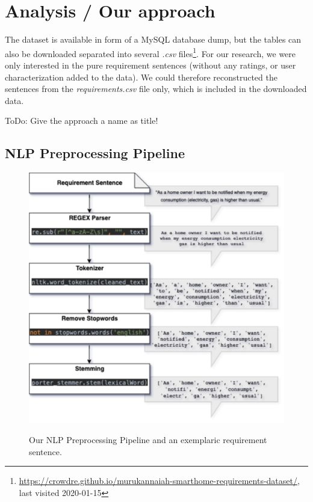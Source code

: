 \section{Analysis / Our approach} %
\label{sec:own_approach}

The \crowdre{} dataset is available in form of a MySQL database dump, but the tables can also be downloaded separated into several \textit{.csv} files\footnote{\url{https://crowdre.github.io/murukannaiah-smarthome-requirements-dataset/}, last visited 2020-01-15}. For our research, we were only interested in the pure requirement sentences (without any ratings, or user characterization added to the data). We could therefore reconstructed the sentences from the \textit{requirements.csv} file only, which is included in the downloaded data.

\colorbox{yellow!30}{ToDo:} Give the approach a name as title!

\subsection{NLP Preprocessing Pipeline} %
\label{sub:own_pipeline}

\begin{figure}[ht]
  \caption{Our NLP Preprocessing Pipeline and an exemplaric requirement sentence.}
  \centering
    \includegraphics[width=\textwidth]{figures/NLP Pipeline.png}
    \label{fig:nlp_pipeline}
\end{figure}

